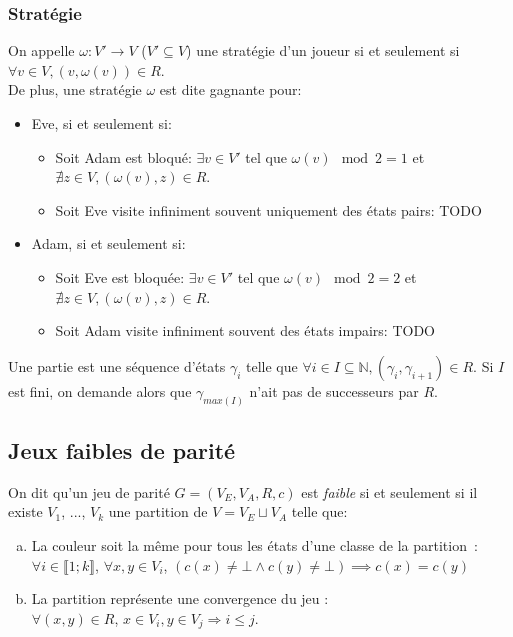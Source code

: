 \documentclass[10pt,a4paper]{article}
\begin{document}
\subsubsection{Stratégie}
On appelle $\omega : V' \to V$ ($V' \subseteq V$) une stratégie d'un joueur si et seulement si $\forall v \in V, (v,\omega(v)) \in R$.\\
De plus, une stratégie $\omega$ est dite gagnante pour:
\begin{itemize}
	\item Eve, si et seulement si:
	\begin{itemize}
		\item Soit Adam est bloqué: $\exists v \in V'$ tel que $\omega(v) \mod 2 = 1$ et $\nexists z \in V, (\omega(v), z) \in R$.
		\item Soit Eve visite infiniment souvent uniquement des états pairs: TODO
	\end{itemize}
	\item Adam, si et seulement si:
	\begin{itemize}
		\item Soit Eve est bloquée: $\exists v \in V'$ tel que $\omega(v) \mod 2 = 2$ et $\nexists z \in V, (\omega(v), z) \in R$.
		\item Soit Adam visite infiniment souvent des états impairs: TODO
\end{itemize}
\end{itemize}

Une partie est une séquence d'états $\gamma_i$ telle que $\forall i \in I \subseteq \mathbb{N}, (\gamma_i,\gamma_{i+1}) \in R$. Si $I$ est fini, on demande alors que $\gamma_{max(I)}$ n'ait pas de successeurs par $R$.

\subsection{Jeux faibles de parité}

On dit qu'un jeu de parité $G = (V_E,V_A,R,c)$ est \emph{faible}  si et seulement si il existe $V_1$, ..., $V_k$ une partition de $V = V_E \sqcup V_A$ telle que:
\begin{enumerate}[a)]
\item La couleur soit la même pour tous les états d'une classe de la partition : $\forall i \in \llbracket 1 ; k \rrbracket$, $\forall x, y \in V_i$, $(c(x) \neq \bot \land c(y) \neq \bot)  \implies c(x) = c(y)$
\item La partition représente une convergence du jeu :\\
$\forall (x, y) \in R$, $x\in V_i, y \in V_j \Rightarrow i \leq j$.
\end{enumerate}
\end{document}
